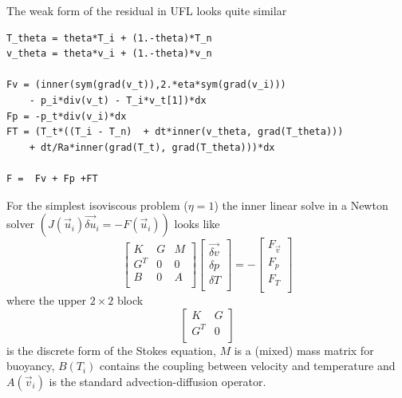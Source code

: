 The weak form of the residual in UFL looks quite similar
\begin{lstlisting}[style=UFL]
T_theta = theta*T_i + (1.-theta)*T_n
v_theta = theta*v_i + (1.-theta)*v_n 

Fv = (inner(sym(grad(v_t)),2.*eta*sym(grad(v_i)))
    - p_i*div(v_t) - T_i*v_t[1])*dx  
Fp = -p_t*div(v_i)*dx 
FT = (T_t*((T_i - T_n)  + dt*inner(v_theta, grad(T_theta))) 
    + dt/Ra*inner(grad(T_t), grad(T_theta)))*dx 

F =  Fv + Fp +FT
\end{lstlisting}

For the simplest
isoviscous problem ($\eta=1$) the inner linear solve in a Newton solver
$(J\left(\vec{u}_i\right)\vec{\delta u}_i=-F\left(\vec{u}_i\right))$ looks like
\begin{equation}
  \label{eq:4.7}
  \left[
\begin{array}{ccc}
  K & G  & M \\
  G^{T} & 0 & 0 \\
  B & 0 & A \\ 
  \end{array}
  \right]
  \left[
    \begin{array}{c}
      \vec{\delta v} \\
      \delta p \\
      \delta T \\
    \end{array}
  \right] = -\left[
    \begin{array}{c}
      F_{\vec{v}}\\
      F_{p}\\
      F_{T}\\
    \end{array}
  \right]
\end{equation}
where the upper $2\times2$ block
\begin{displaymath}
     \left[
\begin{array}{cc}
  K & G  \\
  G^{T} & 0 \\
  \end{array}
  \right]
\end{displaymath}
is the discrete form of the Stokes equation, 
$M$ is a (mixed) mass matrix for buoyancy, $B(T_i)$ contains the
coupling between velocity and temperature and $A(\vec{v}_i)$ is the standard
advection-diffusion operator.  


